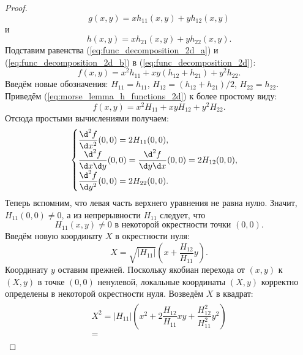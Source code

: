 \documentclass[a4paper,12pt,openany,leqno]{extbook}
\begin{document}
\begin{proof}
\begin{equation}
g(x, y) = x h_{11}(x, y) + y h_{12}(x, y)
\label{eq:func_decomposition_2d_a}
\end{equation}
и
\begin{equation}
h(x, y) = x h_{21}(x, y) + y h_{22}(x, y).
\label{eq:func_decomposition_2d_b}
\end{equation}
Подставим равенства (\ref{eq:func_decomposition_2d_a}) и (\ref{eq:func_decomposition_2d_b}) в (\ref{eq:func_decomposition_2d}):
\begin{equation}
f(x, y) = x^2 h_{11} + xy(h_{12} + h_{21}) + y^2 h_{22}.
\label{eq:morse_lemma_h_functions_2d}
\end{equation}
Введём новые обозначения: $H_{11} = h_{11}$, $H_{12} = (h_{12} + h_{21}) / 2$, $H_{22} = h_{22}$. Приведём (\ref{eq:morse_lemma_h_functions_2d}) к более простому виду:
\begin{equation}
f(x, y) = x^2 H_{11} + xy H_{12} + y^2 H_{22}.
\label{eq:morse_lemma_H_functions_2d}
\end{equation}
Отсюда простыми вычислениями получаем:
\begin{equation}
\begin{cases}
\dfrac{\d^2 f}{\d x^2}(0, 0) = 2H_{11}(0, 0),\\
\dfrac{\d^2 f}{\d x \d y}(0, 0) = \dfrac{\d^2 f}{\d y \d x}(0, 0) = 2H_{12}(0, 0),\\
\dfrac{\d^2 f}{\d y^2}(0, 0) = 2H_{22}(0, 0).
\end{cases}
\label{eq:morse_lemma_H_second_derivatives_2d}
\end{equation}
Теперь вспомним, что левая часть верхнего уравнения не равна нулю. Значит, $H_{11}(0, 0) \neq 0$, а из непрерывности $H_{11}$ следует, что
\begin{equation}
H_{11}(x, y) \neq 0 \text{ в некоторой окрестности точки } (0, 0).
\end{equation}
Введём новую координату $X$ в окрестности нуля:
\begin{equation}
X = \sqrt{|H_{11}|}\left(x + \dfrac{H_{12}}{H_{11}}y\right).
\end{equation} 
Координату $y$ оставим прежней. Поскольку якобиан перехода от $(x, y)$ к $(X, y)$ в точке $(0, 0)$ ненулевой, локальные координаты $(X, y)$ корректно определены в некоторой окрестности нуля. Возведём $X$ в квадрат:
\begin{align}
\begin{split}
X^2 = |H_{11}|\left(x^2 + 2\dfrac{H_{12}}{H_{11}} xy + \dfrac{H^2_{12}}{H^2_{11}} y^2 \right) \\=

\end{split}
\end{align}
\end{proof}
\end{document}
